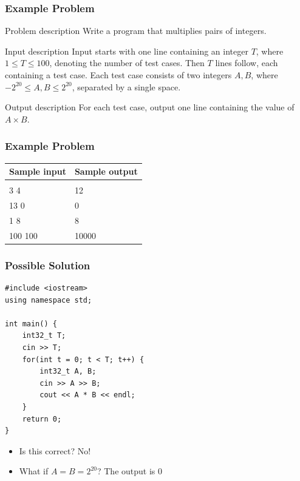 \documentclass{beamer}
\begin{document}
\begin{frame}[plain]
	\frametitle{Example Problem}
	\begin{block}{Problem description}
    		Write a program that multiplies pairs of integers.
    \end{block}

    \vspace{10pt}
    
    \begin{block}{Input description}
    		Input starts with one line containing an integer $T$, where $1\leq T \leq
    100$, denoting the number of test cases. Then $T$ lines follow, each
    containing a test case. Each test case consists of two integers $A,B$,
    where $-2^{20} \leq A,B \leq 2^{20}$, separated by a single space.
    \end{block}

    \vspace{10pt}
    
    \begin{block}{Output description}
    		For each test case, output one line containing the value of $A\times B$.
    \end{block}
\end{frame}

\begin{frame}[plain]
	\frametitle{Example Problem}
	\begin{center}
		\begin{tabular}{|l|l|}
            \hline
            {\footnotesize Sample input} & {\footnotesize Sample output} \\
            \hline
            \ttfamily
            4 &  \\
            3 4 & 12 \\
            13 0 & 0 \\
            1 8 & 8 \\
            100 100 & 10000 \\
            \hline
        \end{tabular}
    \end{center}
\end{frame}

\begin{frame}
    \frametitle{Possible Solution}
	\begin{scriptsize}
        \begin{verbatim}
#include <iostream>
using namespace std;

int main() {
    int32_t T;
    cin >> T;
    for(int t = 0; t < T; t++) {
        int32_t A, B;
        cin >> A >> B;
        cout << A * B << endl;
    }
    return 0;
}
        \end{verbatim}
    \end{scriptsize}
    \begin{itemize}
       \item<2-> Is this correct?  {\alert{No!}}
       \item<3-> What if $A = B = 2^{20}$?  {The output is $0$ }
    \end{itemize}
\end{frame}
\end{document}
